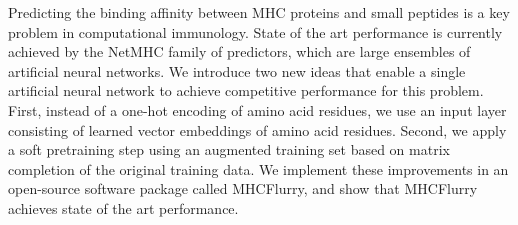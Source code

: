 Predicting the binding affinity between MHC proteins and small peptides is a key problem in computational immunology. State of the art performance is currently achieved by the NetMHC family of predictors, which are large ensembles of artificial neural networks. We introduce two new ideas that enable a single artificial neural network to achieve competitive performance for this problem. First, instead of a one-hot encoding of amino acid residues, we use an input layer consisting of learned vector embeddings of amino acid residues. Second, we apply a soft pretraining step using an augmented training set based on matrix completion of the original training data. We implement these improvements in an open-source software package called MHCFlurry, and show that MHCFlurry achieves state of the art performance. 
